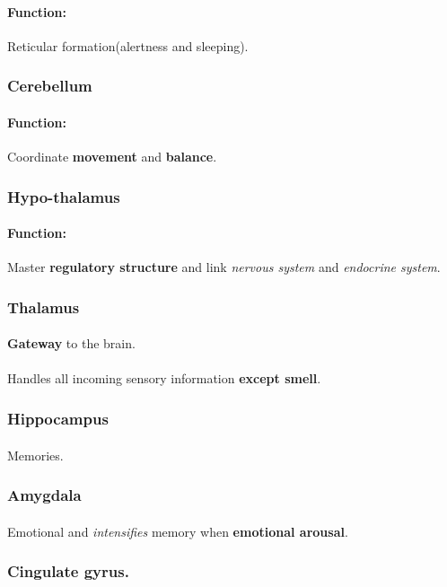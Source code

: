 \documentclass{article}
\begin{document}
	\paragraph{Function:}Reticular formation(alertness and sleeping).
	\subsubsection{Cerebellum}
	\paragraph{Function:}Coordinate \textbf{movement} and \textbf{balance}.
	\subsubsection{Hypo-thalamus}
	\paragraph{Function:} Master \textbf{regulatory structure} and link \emph{nervous system} and \emph{endocrine system}.
	\subsubsection{Thalamus}
	\paragraph{}\textbf{Gateway} to the brain.
	\paragraph{}Handles all incoming sensory information \textbf{except smell}.
	\subsubsection{Hippocampus}
	\paragraph{}Memories.
	\subsubsection{Amygdala}
	\paragraph{} Emotional and \emph{intensifies} memory when \textbf{emotional arousal}.
	\subsubsection{Cingulate gyrus.}
\end{document}
